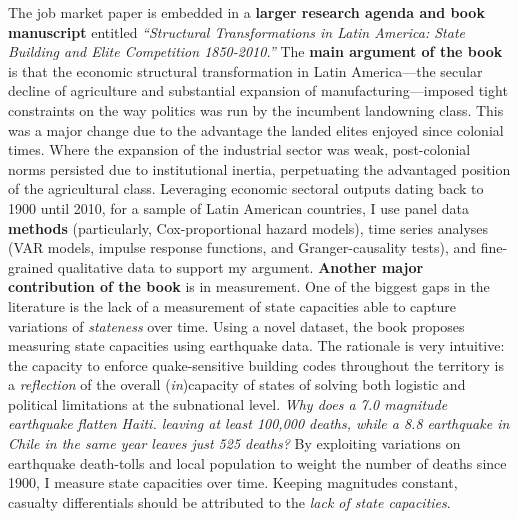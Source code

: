 \documentclass[10pt,stdletter,dateno,sigleft]{newlfm} %
\begin{document}
\begin{newlfm}
The job market paper is embedded in a {\bf larger research agenda and book manuscript} entitled \emph{``Structural Transformations in Latin America: State Building and Elite Competition 1850-2010.''} The {\bf main argument of the book} is that the economic structural transformation in Latin America---the secular decline of agriculture and substantial expansion of manufacturing---imposed tight constraints on the way politics was run by the incumbent landowning class. This was a major change due to the advantage the landed elites enjoyed since colonial times. Where the expansion of the industrial sector was weak, post-colonial norms persisted due to institutional inertia, perpetuating the advantaged position of the agricultural class. Leveraging economic sectoral outputs dating back to 1900 until 2010, for a sample of Latin American countries, I use panel data {\bf methods} (particularly, Cox-proportional hazard models), time series analyses (VAR models, impulse response functions, and Granger-causality tests), and fine-grained qualitative data to support my argument. {\bf Another major contribution of the book} is in measurement. One of the biggest gaps in the literature is the lack of a measurement of state capacities able to capture variations of \emph{stateness} over time. Using a novel dataset, the book proposes measuring state capacities using earthquake data. The rationale is very intuitive: the capacity to enforce quake-sensitive building codes throughout the territory is a \emph{reflection} of the overall (\emph{in})capacity of states of solving both logistic and political limitations at the subnational level. \emph{Why does a 7.0 magnitude earthquake flatten Haiti. leaving at least 100,000 deaths, while a 8.8 earthquake in Chile in the same year leaves just 525 deaths?} By exploiting  variations on earthquake death-tolls and local population to weight the number of deaths since 1900, I measure state capacities over time. Keeping magnitudes constant, casualty differentials should be attributed to the \emph{lack of state capacities}.



\end{newlfm}
\end{document}
